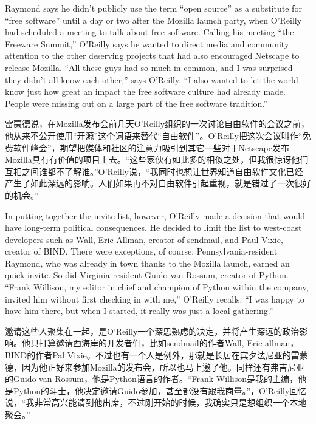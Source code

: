 \ifdefined\eng
Raymond says he didn't publicly use the term ``open source'' as a substitute for ``free software'' until a day or two after the Mozilla launch party, when O'Reilly had scheduled a meeting to talk about free software. Calling his meeting ``the Freeware Summit,'' O'Reilly says he wanted to direct media and community attention to the other deserving projects that had also encouraged Netscape to release Mozilla. ``All these guys had so much in common, and I was surprised they didn't all know each other,'' says O'Reilly. ``I also wanted to let the world know just how great an impact the free software culture had already made. People were missing out on a large part of the free software tradition.''
\fi

\ifdefined\chs
雷蒙德说，在Mozilla发布会前几天O'Reilly组织的一次讨论自由软件的会议之前，他从来不公开使用“开源”这个词语来替代“自由软件”。O'Reilly把这次会议叫作“免费软件峰会”，期望把媒体和社区的注意力吸引到其它一些对于Netscape发布Mozilla具有有价值的项目上去。“这些家伙有如此多的相似之处，但我很惊讶他们互相之间谁都不了解谁。”O'Reilly说，“我同时也想让世界知道自由软件文化已经产生了如此深远的影响。人们如果再不对自由软件引起重视，就是错过了一次很好的机会。”
\fi

\ifdefined\eng
In putting together the invite list, however, O'Reilly made a decision that would have long-term political consequences. He decided to limit the list to west-coast developers such as Wall, Eric Allman, creator of sendmail, and Paul Vixie, creator of BIND. There were exceptions, of course: Pennsylvania-resident Raymond, who was already in town thanks to the Mozilla launch, earned an quick invite. So did Virginia-resident Guido van Rossum, creator of Python. ``Frank Willison, my editor in chief and champion of Python within the company, invited him without first checking in with me,'' O'Reilly recalls. ``I was happy to have him there, but when I started, it really was just a local gathering.''
\fi

\ifdefined\chs
邀请这些人聚集在一起，是O'Reilly一个深思熟虑的决定，并将产生深远的政治影响。他只打算邀请西海岸的开发者们，比如sendmail的作者Wall, Eric allman，BIND的作者Pal Vixie。不过也有一个人是例外，那就是长居在宾夕法尼亚的雷蒙德，因为他正好来参加Mozilla的发布会，所以也马上邀了他。同样还有弗吉尼亚的Guido van Rossum，他是Python语言的作者。“Frank Willison是我的主编，他是Python的斗士，他决定邀请Guido参加，甚至都没有跟我商量。”，O'Reilly回忆说，“我非常高兴能请到他出席，不过刚开始的时候，我确实只是想组织一个本地聚会。”
\fi

